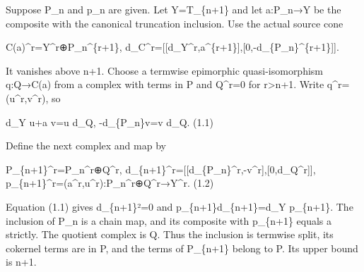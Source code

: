 \documentclass[11pt]{article}
\begin{document}
Suppose P\_\allowbreak{}n and p\_\allowbreak{}n are given. Let Y\allowbreak{}=T\_\allowbreak{}\{n\allowbreak{}+1\} and let a:\allowbreak{}P\_\allowbreak{}n\allowbreak{}→Y be the composite with the canonical truncation inclusion. Use the actual source cone

C(a)\allowbreak{}\textasciicircum{}r\allowbreak{}=Y\textasciicircum{}r\allowbreak{}⊕P\_\allowbreak{}n\textasciicircum{}\{r\allowbreak{}+1\},\allowbreak{} d\_\allowbreak{}C\textasciicircum{}r\allowbreak{}=[[d\_\allowbreak{}Y\textasciicircum{}r,\allowbreak{}a\textasciicircum{}\{r\allowbreak{}+1\}]\allowbreak{},\allowbreak{}[0,\allowbreak{}-d\_\allowbreak{}\{P\_\allowbreak{}n\}\textasciicircum{}\{r\allowbreak{}+1\}]\allowbreak{}]\allowbreak{}.

It vanishes above n\allowbreak{}+1. Choose a termwise epimorphic quasi-isomorphism q:\allowbreak{}Q\allowbreak{}→C(a)\allowbreak{} from a complex with terms in P and Q\textasciicircum{}r\allowbreak{}=0 for r>n\allowbreak{}+1. Write q\textasciicircum{}r\allowbreak{}=(u\textasciicircum{}r,\allowbreak{}v\textasciicircum{}r)\allowbreak{},\allowbreak{} so

d\_\allowbreak{}Y u\allowbreak{}+a v\allowbreak{}=u d\_\allowbreak{}Q,\allowbreak{} -d\_\allowbreak{}\{P\_\allowbreak{}n\}v\allowbreak{}=v d\_\allowbreak{}Q. (1.1)\allowbreak{}

Define the next complex and map by

P\_\allowbreak{}\{n\allowbreak{}+1\}\textasciicircum{}r\allowbreak{}=P\_\allowbreak{}n\textasciicircum{}r\allowbreak{}⊕Q\textasciicircum{}r,\allowbreak{} d\_\allowbreak{}\{n\allowbreak{}+1\}\textasciicircum{}r\allowbreak{}=[[d\_\allowbreak{}\{P\_\allowbreak{}n\}\textasciicircum{}r,\allowbreak{}-v\textasciicircum{}r]\allowbreak{},\allowbreak{}[0,\allowbreak{}d\_\allowbreak{}Q\textasciicircum{}r]\allowbreak{}]\allowbreak{},\allowbreak{} p\_\allowbreak{}\{n\allowbreak{}+1\}\textasciicircum{}r\allowbreak{}=(a\textasciicircum{}r,\allowbreak{}u\textasciicircum{}r)\allowbreak{}:\allowbreak{}P\_\allowbreak{}n\textasciicircum{}r\allowbreak{}⊕Q\textasciicircum{}r\allowbreak{}→Y\textasciicircum{}r. (1.2)\allowbreak{}

Equation (1.1)\allowbreak{} gives d\_\allowbreak{}\{n\allowbreak{}+1\}²\allowbreak{}=0 and p\_\allowbreak{}\{n\allowbreak{}+1\}d\_\allowbreak{}\{n\allowbreak{}+1\}\allowbreak{}=d\_\allowbreak{}Y p\_\allowbreak{}\{n\allowbreak{}+1\}. The inclusion of P\_\allowbreak{}n is a chain map,\allowbreak{} and its composite with p\_\allowbreak{}\{n\allowbreak{}+1\} equals a strictly. The quotient complex is Q. Thus the inclusion is termwise split,\allowbreak{} its cokernel terms are in P,\allowbreak{} and the terms of P\_\allowbreak{}\{n\allowbreak{}+1\} belong to P. Its upper bound is n\allowbreak{}+1.
\end{document}
